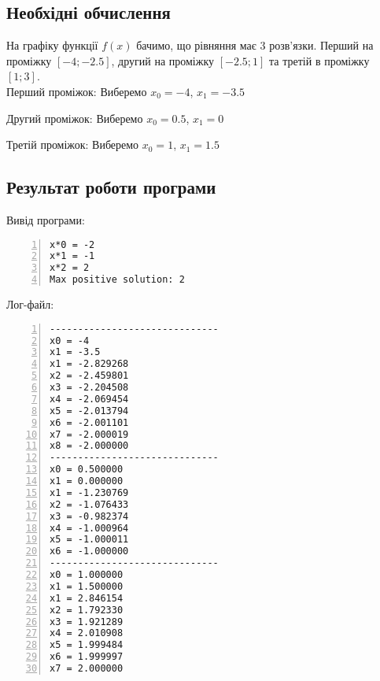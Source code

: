 \documentclass[a4paper, 12pt]{article}
\begin{document}
\subsection{Необхідні обчислення}

На графіку функції $f(x)$ бачимо, що рівняння має 3 розв'язки. Перший на проміжку $\left[-4; -2.5\right]$, другий на проміжку $\left[-2.5; 1\right]$ та третій в проміжку $\left[1; 3\right]$.\\

Перший проміжок: Виберемо $x_0 = -4$, $ x_1 = -3.5$

Другий проміжок: Виберемо $x_0 = 0.5$, $ x_1 = 0$

Третій проміжок: Виберемо $x_0 = 1$, $ x_1 = 1.5$

\subsection{Результат роботи програми}

Вивід програми:

\begin{Verbatim}[numbers=left,xleftmargin=20mm]
x*0 = -2
x*1 = -1
x*2 = 2
Max positive solution: 2
\end{Verbatim}

Лог-файл:

\begin{Verbatim}[numbers=left,xleftmargin=20mm]
------------------------------
x0 = -4
x1 = -3.5
x1 = -2.829268
x2 = -2.459801
x3 = -2.204508
x4 = -2.069454
x5 = -2.013794
x6 = -2.001101
x7 = -2.000019
x8 = -2.000000
------------------------------
x0 = 0.500000
x1 = 0.000000
x1 = -1.230769
x2 = -1.076433
x3 = -0.982374
x4 = -1.000964
x5 = -1.000011
x6 = -1.000000
------------------------------
x0 = 1.000000
x1 = 1.500000
x1 = 2.846154
x2 = 1.792330
x3 = 1.921289
x4 = 2.010908
x5 = 1.999484
x6 = 1.999997
x7 = 2.000000
\end{Verbatim}
\end{document}
